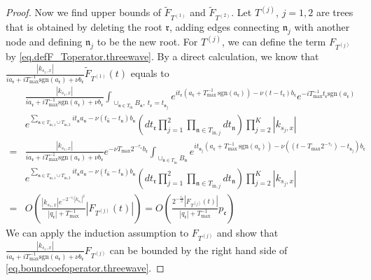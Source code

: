 \begin{proof}
Now we find upper bounds of $\widetilde{F}_{T^{(1)}}$ and $\widetilde{F}_{T^{(2)}}$. Let $T^{(j)}$, $j=1,2$ are trees that is obtained by deleting the root $\mathfrak{r}$, adding edges connecting $\mathfrak{n}_j$ with another node and defining $\mathfrak{n}_j$ to be the new root. For $T^{(j)}$, we can define the term $F_{T^{(j)}}$ by \eqref{eq.defF_Toperator.threewave}. By a direct calculation, we know that $\frac{|k_{s_1,x}|}{ia_{\mathfrak{r}}+iT^{-1}_{\text{max}} \text{sgn}(a_{\mathfrak{r}})+\nu b_{\mathfrak{r}} }\widetilde{F}_{T^{(1)}}(t)$ equals to
\begin{equation}
    \begin{split}
        &\frac{|k_{s_1,x}|}{ia_{\mathfrak{r}}+iT^{-1}_{\text{max}} \text{sgn}(a_{\mathfrak{r}})+\nu b_{\mathfrak{r}} } \int_{\cup_{\mathfrak{n}\in T_{\text{in}}} B_{\mathfrak{n}},\ t_{\mathfrak{r}}=t_{\mathfrak{n}_j}} e^{it_{\mathfrak{r}}(a_{\mathfrak{r}}+T^{-1}_{\text{max}}\, \text{sgn}(a_{\mathfrak{r}}))- \nu(t-t_{\mathfrak{r}})b_{\mathfrak{r}}} e^{-iT^{-1}_{\text{max}}t_{\mathfrak{r}} \text{sgn}(a_{\mathfrak{r}})} 
        \\
        &e^{\sum_{\mathfrak{n}\in T_{\text{in},1}\cup T_{\text{in},2}} it_{\mathfrak{n}} a_{\mathfrak{n}} - \nu(t_{\widehat{\mathfrak{n}}}-t_{\mathfrak{n}})b_{\mathfrak{n}}} \left(dt_{\mathfrak{r}}\prod_{j=1}^2\prod_{\mathfrak{n}\in T_{\text{in},j}}dt_{\mathfrak{n}}  \right)\prod^K_{j=2}|k_{s_j,x}|
        \\
        =&\frac{|k_{s_1,x}|}{ia_{\mathfrak{r}}+iT^{-1}_{\text{max}} \text{sgn}(a_{\mathfrak{r}})+\nu b_{\mathfrak{r}} }  e^{- \nu T_{\text{max}} 2^{-\tau_{1}}b_{\mathfrak{r}}}\int_{\cup_{\mathfrak{n}\in T_{\text{in}}} B_{\mathfrak{n}}} e^{it_{\mathfrak{n}_j}(a_{\mathfrak{r}}+T^{-1}_{\text{max}}\, \text{sgn}(a_{\mathfrak{r}}))- \nu((t-T_{\text{max}} 2^{-\tau_{1}})-t_{\mathfrak{n}_j})b_{\mathfrak{r}}}
        \\
        &  e^{\sum_{\mathfrak{n}\in T_{\text{in},1}\cup T_{\text{in},2}} it_{\mathfrak{n}} a_{\mathfrak{n}} - \nu(t_{\widehat{\mathfrak{n}}}-t_{\mathfrak{n}})b_{\mathfrak{n}}}\left(dt_{\mathfrak{r}}\prod_{j=1}^2\prod_{\mathfrak{n}\in T_{\text{in},j}}dt_{\mathfrak{n}}  \right)\prod^K_{j=2}|k_{s_j,x}|
        \\
        =&O\left(\frac{|k_{s_1,x}|e^{- 2^{-\tau_{1}}|k_{s_1}|^2} }{|q_{\mathfrak{r}}|+T^{-1}_{\text{max}}} |F_{T^{(j)}}(t)|\right)=O\left(\frac{2^{-\frac{\tau_{1}}{2}}|F_{T^{(j)}}(t)| }{|q_{\mathfrak{r}}|+T^{-1}_{\text{max}}}p_{\mathfrak{e}}\right)
    \end{split}
\end{equation}
We can apply the induction assumption to $F_{T^{(j)}}$ and show that $\frac{|k_{s_1,x}|}{ia_{\mathfrak{r}}+iT^{-1}_{\text{max}} \text{sgn}(a_{\mathfrak{r}})+\nu b_{\mathfrak{r}} } F_{T^{(j)}}$ can be bounded by the right hand side of \eqref{eq.boundcoefoperator.threewave}.



\end{proof}
